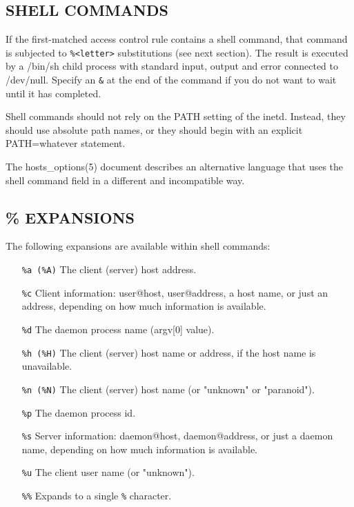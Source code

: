 \documentclass[11pt,twoside,onecolumn]{book}
\begin{document}
\subsection*{SHELL COMMANDS}

If the first-matched access control rule contains a shell command, that
command is subjected to {\tt \%<letter>} substitutions (see next section).
The result is executed by a /bin/sh child process with standard
input, output and error connected to /dev/null.  Specify an {\tt \&}
at the end of the command if you do not want to wait until it has
completed.

Shell commands should not rely on the PATH setting of the inetd.
Instead, they should use absolute path names, or they should begin with
an explicit PATH=whatever statement.

The hosts\_options(5) document describes an alternative language
that uses the shell command field in a different and incompatible way.

\subsection*{\% EXPANSIONS}

The following expansions are available within shell commands:

\begin{itemize}

\item[\tt \%a (\%A)] The client (server) host address.
\item[\tt \%c] Client information: user@host, user@address, a host name, or just an
address, depending on how much information is available.
\item[\tt \%d] The daemon process name (argv[0] value).
\item[\tt \%h (\%H)]
The client (server) host name or address, if the host name is
unavailable.
\item[\tt \%n (\%N)] The client (server) host name (or "unknown" or "paranoid").
\item[\tt \%p] The daemon process id.
\item[\tt \%s]  Server information: daemon@host, daemon@address, or just a daemon name,
depending on how much information is available.
\item [\tt \%u] The client user name (or "unknown").
\item [\tt \%\%] Expands to a single {\tt \%} character.

\end{itemize}
\end{document}
